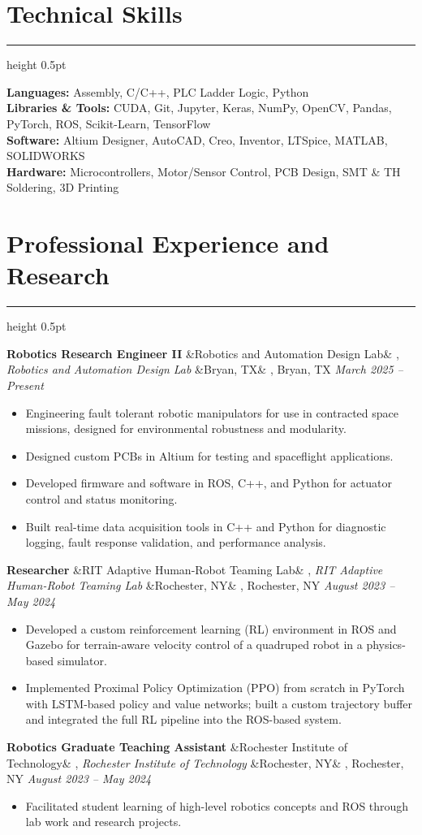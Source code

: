 \documentclass[letterpaper,10pt]{article}
\newcommand{\heading}[1]{%
    \vspace{-5mm} %
    \section*{#1}%
    \vspace{-3mm}%
    \noindent\hrule height 0.5pt %
    \vspace{4mm}%
}
\newcommand{\experience}[5]{%
    \noindent\textbf{#1}%
    \ifx&#2&
    \else
        , \textit{#2}%
    \fi
    \ifx&#3&
    \else
        , #3%
    \fi
    \hfill \textit{#4} \\
    \vspace{-6.8mm}%
    \begin{itemize}[itemsep=-5pt]
        \setlength{\itemindent}{0em}
        #5
    \end{itemize}
    \vspace{1mm}
}
\begin{document}
\heading{Technical Skills}
\vspace{-1mm}%
\noindent\textbf{Languages:} Assembly, C/C++, PLC Ladder Logic, Python \\
\textbf{Libraries \& Tools:} CUDA, Git, Jupyter, Keras, NumPy, OpenCV, Pandas, PyTorch, ROS, Scikit-Learn, TensorFlow \\
\textbf{Software:} Altium Designer, AutoCAD, Creo, Inventor, LTSpice, MATLAB, SOLIDWORKS \\
\textbf{Hardware:} Microcontrollers, Motor/Sensor Control, PCB Design, SMT \& TH Soldering, 3D Printing \\


\heading{Professional Experience and Research}

\experience
    {Robotics Research Engineer II}
    {Robotics and Automation Design Lab}
    {Bryan, TX}
    {March 2025 – Present}
    {
        \item Engineering fault tolerant robotic manipulators for use in contracted space missions, designed for environmental robustness and modularity.
        \item Designed custom PCBs in Altium for testing and spaceflight applications.
        \item Developed firmware and software in ROS, C++, and Python for actuator control and status monitoring.
        \item Built real-time data acquisition tools in C++ and Python for diagnostic logging, fault response validation, and performance analysis.
    }

\experience
    {Researcher}
    {RIT Adaptive Human-Robot Teaming Lab}
    {Rochester, NY}
    {August 2023 – May 2024}
    {
        \item  Developed a custom reinforcement learning (RL) environment in ROS and Gazebo for terrain-aware velocity control of a quadruped robot in a physics-based simulator.
        \item  Implemented Proximal Policy Optimization (PPO) from scratch in PyTorch with LSTM-based policy and value networks; built a custom trajectory buffer and integrated the full RL pipeline into the ROS-based system.
    }
    
\experience
    {Robotics Graduate Teaching Assistant}
    {Rochester Institute of Technology}
    {Rochester, NY}
    {August 2023 – May 2024}
    {
        \item  Facilitated student learning of high-level robotics concepts and ROS through lab work and research projects.
    }
\end{document}

